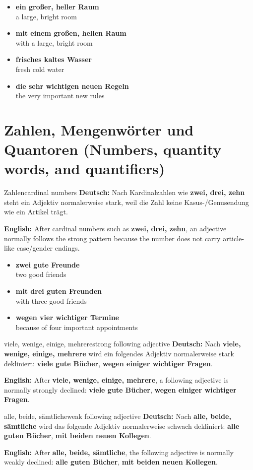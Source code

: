 \documentclass[a4paper,11pt]{article}
\newcommand{\GermanText}[1]{\textbf{Deutsch: }#1\par}
\newcommand{\EnglishText}[1]{{\small\color{SoftGray}\textbf{English: }#1\par}}
\newcommand{\ExampleItem}[2]{\item \textbf{#1}\\{\small\color{SoftGray}#2}}
\begin{document}
\begin{exbox}
\begin{itemize}
\ExampleItem{ein großer, heller Raum}{a large, bright room}
\ExampleItem{mit einem großen, hellen Raum}{with a large, bright room}
\ExampleItem{frisches kaltes Wasser}{fresh cold water}
\ExampleItem{die sehr wichtigen neuen Regeln}{the very important new rules}
\end{itemize}
\end{exbox}

\section{Zahlen, Mengenwörter und Quantoren \textnormal{(Numbers, quantity words, and quantifiers)}}

\begin{grammarentry}{Zahlen}{cardinal numbers}
\GermanText{Nach Kardinalzahlen wie \textbf{zwei, drei, zehn} steht ein Adjektiv normalerweise stark, weil die Zahl keine Kasus-/Genusendung wie ein Artikel trägt.}
\EnglishText{After cardinal numbers such as \textbf{zwei, drei, zehn}, an adjective normally follows the strong pattern because the number does not carry article-like case/gender endings.}
\end{grammarentry}

\begin{exbox}
\begin{itemize}
\ExampleItem{zwei gute Freunde}{two good friends}
\ExampleItem{mit drei guten Freunden}{with three good friends}
\ExampleItem{wegen vier wichtiger Termine}{because of four important appointments}
\end{itemize}
\end{exbox}

\begin{grammarentry}{viele, wenige, einige, mehrere}{strong following adjective}
\GermanText{Nach \textbf{viele, wenige, einige, mehrere} wird ein folgendes Adjektiv normalerweise stark dekliniert: \textbf{viele gute Bücher}, \textbf{wegen einiger wichtiger Fragen}.}
\EnglishText{After \textbf{viele, wenige, einige, mehrere}, a following adjective is normally strongly declined: \textbf{viele gute Bücher}, \textbf{wegen einiger wichtiger Fragen}.}
\end{grammarentry}

\begin{grammarentry}{alle, beide, sämtliche}{weak following adjective}
\GermanText{Nach \textbf{alle, beide, sämtliche} wird das folgende Adjektiv normalerweise schwach dekliniert: \textbf{alle guten Bücher}, \textbf{mit beiden neuen Kollegen}.}
\EnglishText{After \textbf{alle, beide, sämtliche}, the following adjective is normally weakly declined: \textbf{alle guten Bücher}, \textbf{mit beiden neuen Kollegen}.}
\end{grammarentry}
\end{document}
